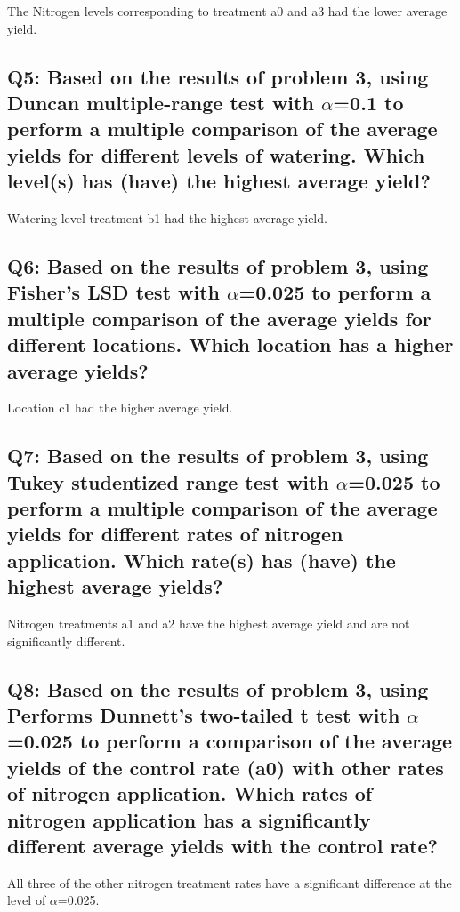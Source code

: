 \documentclass[a4paper,man,natbib]{apa6}
\begin{document}
The Nitrogen levels corresponding to treatment a0 and a3 had the lower average yield.

\subsection*{Q5: Based on the results of problem 3, using Duncan multiple-range test with $\alpha$=0.1 to perform a multiple comparison of the average yields for different levels of watering. Which level(s) has (have) the highest average yield? }
% 

Watering level treatment b1 had the highest average yield.

\subsection*{Q6: Based on the results of problem 3, using Fisher’s LSD test with $\alpha$=0.025 to perform a multiple comparison of the average yields for different locations. Which location has a higher average yields? }
% 

Location c1 had the higher average yield.

\subsection*{Q7: Based on the results of problem 3, using Tukey studentized range test with $\alpha$=0.025 to perform a multiple comparison of the average yields for different rates of nitrogen application. Which rate(s) has (have) the highest average yields? }
% 

Nitrogen treatments a1 and a2 have the highest average yield and are not significantly different.

\subsection*{Q8: Based on the results of problem 3, using Performs Dunnett’s two-tailed t test with $\alpha$=0.025 to perform a comparison of the average yields of the control rate (a0) with other rates of nitrogen application. Which rates of nitrogen application has a significantly different average yields with the control rate? }
% 

All three of the other nitrogen treatment rates have a significant difference at the level of $\alpha$=0.025.



\end{document}

